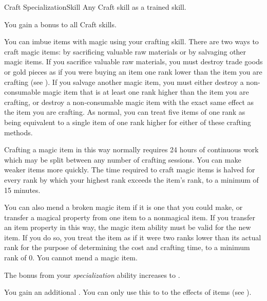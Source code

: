     \begin{feat}{Craft Specialization}{Skill}
        \featpre Any Craft skill as a trained skill.

         You gain a  bonus to all Craft skills.

         You can imbue items with magic using your crafting skill.
        There are two ways to craft magic items: by sacrificing valuable raw materials or by salvaging other magic items.
        If you sacrifice valuable raw materials, you must destroy trade goods or gold pieces as if you were buying an item one rank lower than the item you are crafting  (see ).
        If you salvage another magic item, you must either destroy a non-consumable magic item that is at least one rank higher than the item you are crafting, or destroy a non-consumable magic item with the exact same effect as the item you are crafting.
        As normal, you can treat five items of one rank as being equivalent to a single item of one rank higher for either of these crafting methods.

        Crafting a magic item in this way normally requires 24 hours of continuous work which may be split between any number of crafting sessions.
        You can make weaker items more quickly.
        The time required to craft magic items is halved for every rank by which your highest rank exceeds the item's rank, to a minimum of 15 minutes.

        You can also mend a broken magic item if it is one that you could make, or transfer a magical property from one item to a nonmagical item.
        If you transfer an item property in this way, the magic item ability must be valid for the new item.
        If you do so, you treat the item as if it were two ranks lower than its actual rank for the purpose of determining the cost and crafting time, to a minimum rank of 0.
        You cannot mend a  magic item.

         The bonus from your \textit{specialization} ability increases to .

         You gain an additional .
        You can only use this  to  to the effects of items (see ).
    \end{feat}

